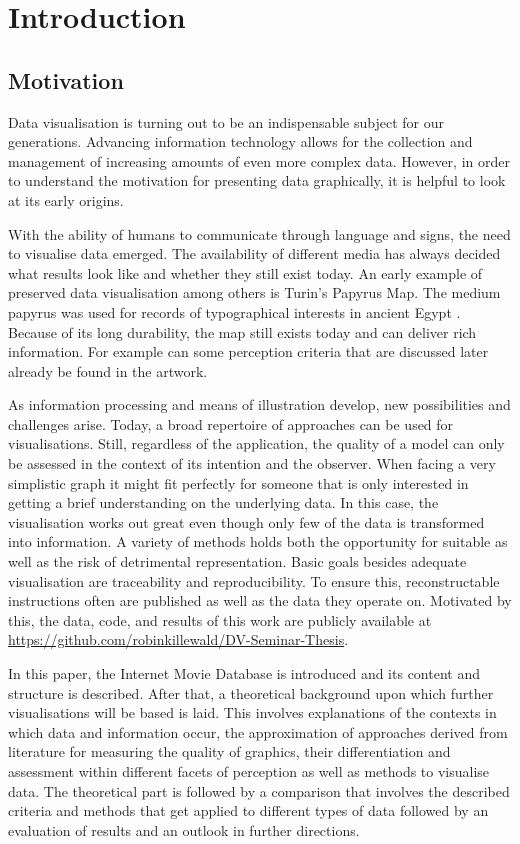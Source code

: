 \chapter{Introduction}
\section{Motivation}

Data visualisation is turning out to be an indispensable subject for our generations. Advancing information technology allows for the collection and management of increasing amounts of even more complex data. However, in order to understand the motivation for presenting data graphically, it is helpful to look at its early origins.

With the ability of humans to communicate through language and signs, the need to visualise data emerged. The availability of different media has always decided what results look like and whether they still exist today. An early example of preserved data visualisation among others is Turin's Papyrus Map. The medium papyrus was used for records of typographical interests in ancient Egypt \citep{harrell1992}. Because of its long durability, the map still exists today and can deliver rich information. For example can some perception criteria that are discussed later already be found in the artwork.

As information processing and means of illustration develop, new possibilities and challenges arise. Today, a broad repertoire of approaches can be used for visualisations. Still, regardless of the application, the quality of a model can only be assessed in the context of its intention and the observer. When facing a very simplistic graph it might fit perfectly for someone that is only interested in getting a brief understanding on the underlying data. In this case, the visualisation works out great even though only few of the data is transformed into information. A variety of methods holds both the opportunity for suitable as well as the risk of detrimental representation. Basic goals besides adequate visualisation are traceability and reproducibility. To ensure this, reconstructable instructions often are published as well as the data they operate on. Motivated by this, the data, code, and results of this work are publicly available at \url{https://github.com/robinkillewald/DV-Seminar-Thesis}.

In this paper, the Internet Movie Database is introduced and its content and structure is described. After that, a theoretical background upon which further visualisations will be based is laid. This involves explanations of the contexts in which data and information occur, the approximation of approaches derived from literature for measuring the quality of graphics, their differentiation and assessment within different facets of perception as well as methods to visualise data. The theoretical part is followed by a comparison that involves the described criteria and methods that get applied to different types of data followed by an evaluation of results and an outlook in further directions. 

